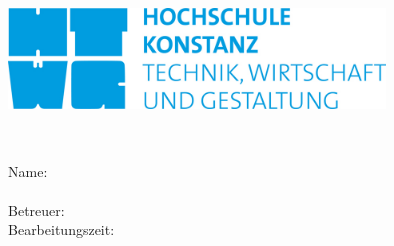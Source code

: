 \thispagestyle{plain}
{
}{}
\begin{titlepage}	
		\sffamily
			\begin{minipage}[t!]{0.35\textwidth}
			\begin{flushleft}
				{
					\includegraphics[width=0.75\textwidth]{Bilder/HTWG_Logo}
				}{}
			\end{flushleft}
			\end{minipage}
			\hfill
			\begin{minipage}[t!]{0.5\textwidth}
			\begin{flushright}
			
			\end{flushright}
			\end{minipage}
			\vskip 1cm
			\hskip 8.5cm
		\begin{minipage}[t!]{0.57\textwidth}
			\begin{flushleft}
				\hfill
				\vskip 2cm
				{\fontsize{45}{10}\textsc{\art}}
				\vskip 2.7cm
				{\Huge\titel\\}
			\end{flushleft}
		\end{minipage}
			\vfill

			\begin{minipage}[!b]{0.38\textwidth}
			\hfill
			\end{minipage}
			\quad
			{\normalsize
			\begin{minipage}[!b]{0.57\textwidth}
				\begin{minipage}[t]{0.38\textwidth}
						Name:\\
						\\
						Betreuer:\\
						Bearbeitungszeit:\\
				\end{minipage}
				\begin{minipage}[t]{0.57\textwidth}
					\autor\\
					\autors\\
					\betreuer\\
					\bearbeitungszeit
				\end{minipage}
			\end{minipage}
			}
	\ClearWallPaper
\end{titlepage}
\restoregeometry
